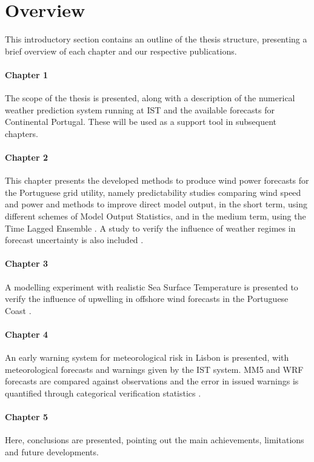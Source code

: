 \chapter{Overview}\label{sec:overview} 

This introductory section contains an outline of the thesis structure, presenting a brief overview of each chapter and our respective publications.

\subsubsection*{Chapter 1}

The scope of the thesis is presented, along with a description of the numerical weather prediction system running at IST and the available forecasts for Continental Portugal. These will be used as a support tool in subsequent chapters.

\subsubsection*{Chapter 2}

This chapter presents the developed methods to produce wind power forecasts for the Portuguese grid utility, namely predictability studies comparing wind speed and power \citep{AME2006, ENER2006} and methods to improve direct model output, in the short term, using different schemes of Model Output Statistics, and in the medium term, using the Time Lagged Ensemble \citep{Aveiro2007, EMS2007, EWEC2008}. A study to verify the influence of weather regimes in forecast uncertainty is also included \citep{EWEC2008}.

\subsubsection*{Chapter 3}

A modelling experiment with realistic Sea Surface Temperature is presented to verify the influence of upwelling in offshore wind forecasts in the Portuguese Coast \citep{EOW2009}.

\subsubsection*{Chapter 4}

An early warning system for meteorological risk in Lisbon is presented, with meteorological forecasts and warnings given by the IST system. MM5 and WRF forecasts are compared against observations and the error in issued warnings is quantified through categorical verification statistics \citep{ISCRAM2011}.

\subsubsection*{Chapter 5}

Here, conclusions are presented, pointing out the main achievements, limitations and future developments.